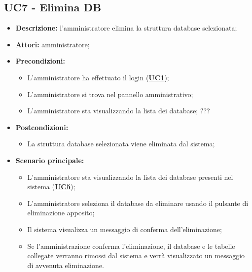 \subsection{UC7 - Elimina DB}
\label{sec:UC7}
\begin{itemize}
	\item \textbf{Descrizione:} l’amministratore elimina la struttura database selezionata;
	\item \textbf{Attori:} amministratore;
	\item \textbf{Precondizioni:} 
	\begin{itemize}
		\item L’amministratore ha effettuato il login (\hyperref[sec:UC1]{\textbf{UC1}});
		\item L’amministratore si trova nel pannello amministrativo;
		\item L’amministratore sta visualizzando la lista dei database; ???
	\end{itemize}
	\item \textbf{Postcondizioni:} 
	\begin{itemize}
		\item La struttura database selezionata viene eliminata dal sistema;
	\end{itemize}
	\item \textbf{Scenario principale:} 
	\begin{itemize}
		\item L'amministratore sta visualizzando la lista dei database presenti nel sistema (\hyperref[sec:UC5]{\textbf{UC5}});
		\item L'amministratore seleziona il database da eliminare usando il pulsante di eliminazione apposito;
		\item Il sistema visualizza un messaggio di conferma dell'eliminazione;
		\item Se l'amministrazione conferma l'eliminazione, il database e le tabelle collegate verranno rimossi dal sistema e verrà visualizzato un messaggio di avvenuta eliminazione.
	\end{itemize}
\end{itemize}

